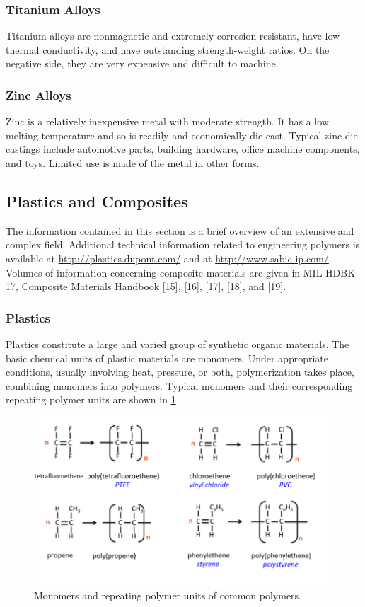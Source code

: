 \documentclass[a4paper,openany,nobib]{tufte-book}
\begin{document}
\subsubsection{Titanium Alloys}
\label{titanium-alloys}
Titanium alloys are nonmagnetic and extremely corrosion-resistant, have
low thermal conductivity, and have outstanding strength-weight ratios.
On the negative side, they are very expensive and difficult to machine.

\subsubsection{Zinc Alloys}
\label{zinc-alloys}
Zinc is a relatively inexpensive metal with moderate strength. It has a
low melting temperature and so is readily and economically die-cast.
Typical zinc die castings include automotive parts, building hardware,
office machine components, and toys. Limited use is made of the metal in
other forms.

\subsection{Plastics and Composites}
\label{plastics-and-composites}
The information contained in this section is a brief overview of an
extensive and complex field. Additional technical information related to
engineering polymers is available at \url{http://plastics.dupont.com/} and
at \url{http://www.sabic-ip.com/}. Volumes of information concerning
composite materials are given in MIL-HDBK 17, Composite Materials
Handbook [15], [16], [17], [18], and [19].

\subsubsection{Plastics}
\label{plastics}
Plastics constitute a large and varied group of synthetic organic
materials. The basic chemical units of plastic materials are monomers.
Under appropriate conditions, usually involving heat, pressure, or both,
polymerization takes place, combining monomers into polymers. Typical
monomers and their corresponding repeating polymer units are shown in
\ref{fig: polymers and repeating units}

\cite{secondaryscience4all}
\begin{figure}[htbp]
\centering
\includegraphics[width=.9\linewidth]{pictures/Material-selection/polymer.png}
\caption{\label{fig: polymers and repeating units}Monomers and repeating polymer units of common polymers.}
\end{figure}
\end{document}
